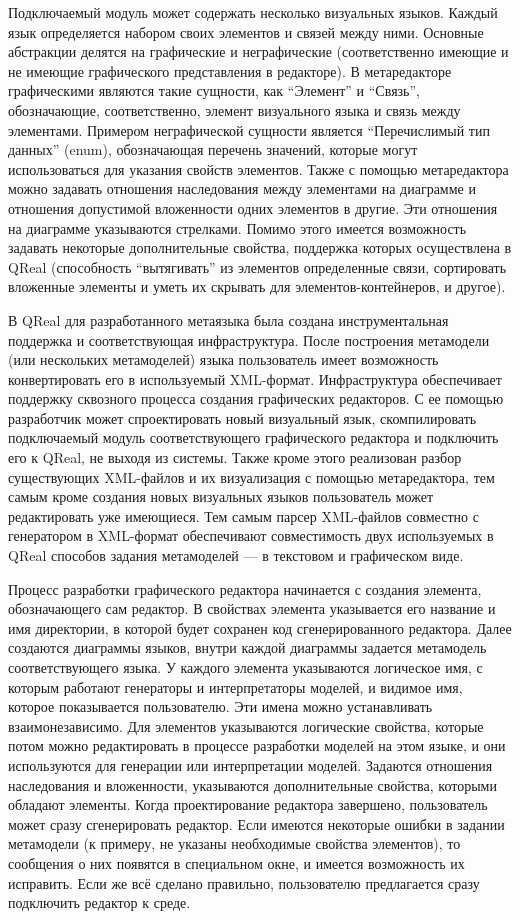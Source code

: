 \documentclass[a4paper]{article}
\begin{document}
Подключаемый модуль может содержать несколько визуальных языков. Каждый язык определяется набором своих элементов и связей между ними. Основные абстракции делятся на графические и неграфические (соответственно имеющие и не имеющие графического представления в редакторе). В метаредакторе графическими являются такие сущности, как ``Элемент''  и ``Связь'', обозначающие, соответственно, элемент визуального языка и связь между элементами. Примером неграфической сущности является ``Перечислимый тип данных'' (enum), обозначающая перечень значений, которые могут использоваться для указания свойств элементов. Также с помощью метаредактора можно задавать отношения наследования между элементами на диаграмме и отношения допустимой вложенности одних элементов в другие. Эти отношения на диаграмме указываются стрелками. Помимо этого имеется возможность задавать некоторые дополнительные свойства, поддержка которых осуществлена в QReal (способность “вытягивать” из элементов определенные связи, сортировать вложенные элементы и уметь их скрывать для элементов-контейнеров, и другое). 

В QReal для разработанного метаязыка была создана инструментальная поддержка и соответствующая инфраструктура. После построения метамодели (или нескольких метамоделей) языка пользователь имеет возможность конвертировать его в используемый XML-формат. Инфраструктура обеспечивает поддержку сквозного процесса создания графических редакторов. С ее помощью разработчик может спроектировать новый визуальный язык, скомпилировать подключаемый модуль соответствующего графического редактора и подключить его к QReal, не выходя из системы. Также кроме этого реализован разбор существующих XML-файлов и их визуализация с помощью метаредактора, тем самым кроме создания новых визуальных языков пользователь может редактировать уже имеющиеся. Тем самым парсер XML-файлов совместно с генератором в XML-формат обеспечивают совместимость двух используемых в QReal способов задания метамоделей --- в текстовом и графическом виде.

Процесс разработки графического редактора начинается с создания элемента, обозначающего сам редактор. В свойствах элемента указывается его название и имя директории, в которой будет сохранен код сгенерированного редактора. Далее создаются диаграммы языков, внутри каждой диаграммы задается метамодель соответствующего языка. У каждого элемента указываются логическое имя, с которым работают генераторы и интерпретаторы моделей, и видимое имя, которое показывается пользователю. Эти имена можно устанавливать взаимонезависимо. Для элементов указываются логические свойства, которые потом можно редактировать в процессе разработки моделей на этом языке, и они используются для генерации или интерпретации моделей. Задаются отношения наследования и вложенности, указываются дополнительные свойства, которыми обладают элементы. Когда проектирование редактора завершено, пользователь может сразу сгенерировать редактор. Если имеются некоторые ошибки в задании метамодели (к примеру, не указаны необходимые свойства элементов), то сообщения о них появятся в специальном окне, и имеется возможность их исправить. Если же всё сделано правильно, пользователю предлагается сразу подключить редактор к среде.  
\end{document}

